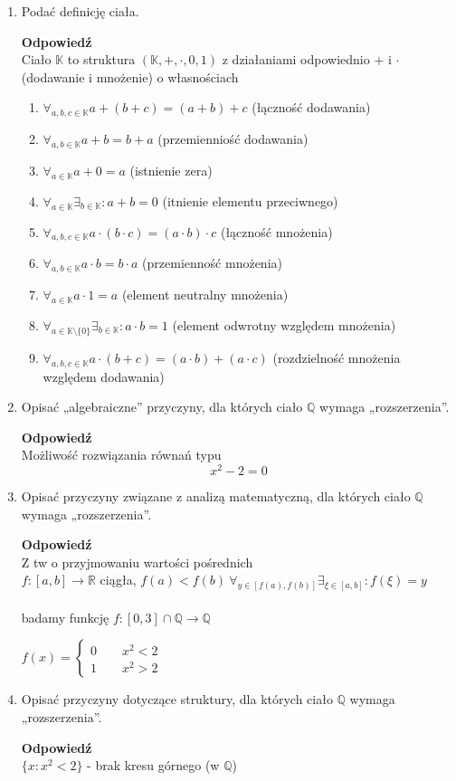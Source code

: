 \documentclass[12pt,a4paper]{article}
\theoremstyle{break}
\newcommand{\Odp}[1]{
		\begin{mdframed}[style=zadanie]
			\textbf{Odpowiedź}\\
			#1
		\end{mdframed}
	}
\newcommand{\UkladRownan}[2]{
	\left\{
	\begin{array}{l}
		#1 \\
		#2
	\end{array}
	\right.
}
\begin{document}
\begin{enumerate}[1.]
	\item Podać definicję ciała.
	\Odp{
		Ciało $\mathbb{K}$ to struktura $(\mathbb{K},+,\cdot,0,1)$ z działaniami odpowiednio $+$ i $\cdot$ (dodawanie i mnożenie) o własnościach 
		\begin{enumerate}[1)]
			\item $\forall_{a,b,c\in \mathbb{K}} a+(b+c)=(a+b)+c$ (łączność dodawania)
			\item $\forall_{a,b\in \mathbb{K}} a+b = b+a$ (przemienniość dodawania)
			\item $\forall_{a\in \mathbb{K}} a+0=a$ (istnienie zera)
			\item $\forall_{a\in\mathbb{K}} \exists_{b\in \mathbb{K}} : a+b=0$ (itnienie elementu przeciwnego)
			\item $\forall_{a,b,c\in \mathbb{K}} a\cdot (b\cdot c) = (a\cdot b)\cdot c$ (łączność mnożenia)
			\item $\forall_{a,b\in\mathbb{K}} a\cdot b=b\cdot a$ (przemienność mnożenia)
			\item $\forall_{a\in\mathbb{K}} a\cdot 1 = a$ (element neutralny mnożenia)
			\item $\forall_{a\in\mathbb{K}\setminus \{0\}} \exists_{b\in\mathbb{K}}: a\cdot b = 1$ (element odwrotny względem mnożenia)
			\item $\forall_{a,b,c\in\mathbb{K}} a\cdot(b+c)=(a\cdot b)+(a\cdot c)$ (rozdzielność mnożenia względem dodawania)
		\end{enumerate}
	}
	
	\item Opisać „algebraiczne” przyczyny, dla których ciało $\mathbb{Q}$ wymaga „rozszerzenia”.
	\Odp{
		Możliwość rozwiązania równań typu
		$$x^2-2=0$$
	}
	
	\item Opisać przyczyny związane z analizą matematyczną, dla których ciało $\mathbb{Q}$ wymaga „rozszerzenia”.
	\Odp{
		Z tw o przyjmowaniu wartości pośrednich\\
 		$f: [a,b] \rightarrow \mathbb{R}$ ciągła, $f(a)<f(b) \: \forall_{y\in [f(a),f(b)]} \exists_{\xi \in [a,b]}: f(\xi)=y$\\\\ 
 		badamy funkcję $f: [0,3]\cap \mathbb{Q} \rightarrow \mathbb{Q}$
 		
 		$f(x)=\UkladRownan{0 \qquad x^2<2}{1 \qquad x^2>2}$
	}
	
	\item Opisać przyczyny dotyczące struktury, dla których ciało $\mathbb{Q}$ wymaga „rozszerzenia”.
	\Odp{
		$\{ x: x^2<2\}$ - brak kresu górnego (w $\mathbb{Q}$)
	}
	

\end{enumerate}
\end{document}
